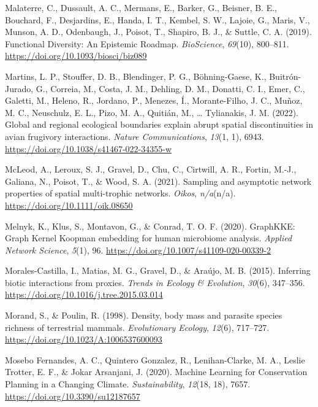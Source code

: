 \documentclass[10pt,oneside]{article}
\newlength{\cslhangindent}
\newenvironment{CSLReferences}[2] %
 {%
  \setlength{\parindent}{0pt}
  \ifodd #1 \everypar{\setlength{\hangindent}{\cslhangindent}}\ignorespaces\fi
  \ifnum #2 > 0
  \setlength{\parskip}{#2\baselineskip}
  \fi
 }%
 {}
\begin{document}
\begin{CSLReferences}{1}{0}
\leavevmode{}%
Malaterre, C., Dussault, A. C., Mermans, E., Barker, G., Beisner, B. E.,
Bouchard, F., Desjardins, E., Handa, I. T., Kembel, S. W., Lajoie, G.,
Maris, V., Munson, A. D., Odenbaugh, J., Poisot, T., Shapiro, B. J., \&
Suttle, C. A. (2019). Functional Diversity: An Epistemic Roadmap.
\emph{BioScience}, \emph{69}(10), 800--811.
\url{https://doi.org/10.1093/biosci/biz089}

\leavevmode{}%
Martins, L. P., Stouffer, D. B., Blendinger, P. G., Böhning-Gaese, K.,
Buitrón-Jurado, G., Correia, M., Costa, J. M., Dehling, D. M., Donatti,
C. I., Emer, C., Galetti, M., Heleno, R., Jordano, P., Menezes, Í.,
Morante-Filho, J. C., Muñoz, M. C., Neuschulz, E. L., Pizo, M. A.,
Quitián, M., \ldots{} Tylianakis, J. M. (2022). Global and regional
ecological boundaries explain abrupt spatial discontinuities in avian
frugivory interactions. \emph{Nature Communications}, \emph{13}(1, 1),
6943. \url{https://doi.org/10.1038/s41467-022-34355-w}

\leavevmode{}%
McLeod, A., Leroux, S. J., Gravel, D., Chu, C., Cirtwill, A. R., Fortin,
M.-J., Galiana, N., Poisot, T., \& Wood, S. A. (2021). Sampling and
asymptotic network properties of spatial multi-trophic networks.
\emph{Oikos}, \emph{n/a}(n/a). \url{https://doi.org/10.1111/oik.08650}

\leavevmode{}%
Melnyk, K., Klus, S., Montavon, G., \& Conrad, T. O. F. (2020).
GraphKKE: Graph Kernel Koopman embedding for human microbiome analysis.
\emph{Applied Network Science}, \emph{5}(1), 96.
\url{https://doi.org/10.1007/s41109-020-00339-2}

\leavevmode{}%
Morales-Castilla, I., Matias, M. G., Gravel, D., \& Araújo, M. B.
(2015). Inferring biotic interactions from proxies. \emph{Trends in
Ecology \& Evolution}, \emph{30}(6), 347--356.
\url{https://doi.org/10.1016/j.tree.2015.03.014}

\leavevmode{}%
Morand, S., \& Poulin, R. (1998). Density, body mass and parasite
species richness of terrestrial mammals. \emph{Evolutionary Ecology},
\emph{12}(6), 717--727. \url{https://doi.org/10.1023/A:1006537600093}

\leavevmode{}%
Mosebo Fernandes, A. C., Quintero Gonzalez, R., Lenihan-Clarke, M. A.,
Leslie Trotter, E. F., \& Jokar Arsanjani, J. (2020). Machine Learning
for Conservation Planning in a Changing Climate. \emph{Sustainability},
\emph{12}(18, 18), 7657. \url{https://doi.org/10.3390/su12187657}


\end{CSLReferences}
\end{document}
